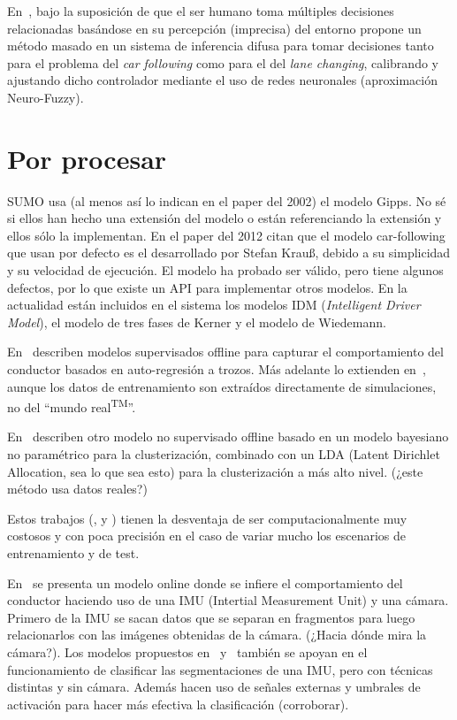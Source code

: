 En~\cite{Ma2004}, bajo la suposición de que el ser humano toma múltiples decisiones relacionadas basándose en su percepción (imprecisa) del entorno propone un método masado en un sistema de inferencia difusa para tomar decisiones tanto para el problema del \textit{car following} como para el del \textit{lane changing}, calibrando y ajustando dicho controlador mediante el uso de redes neuronales (aproximación Neuro-Fuzzy).

\section{Por procesar}

SUMO usa (al menos así lo indican en el paper del 2002) el modelo Gipps\cite{krajzewicz2002sumo}. No sé si ellos han hecho una extensión del modelo o están referenciando la extensión y ellos sólo la implementan. En el paper del 2012 citan que el modelo car-following que usan por defecto es el desarrollado por Stefan Krauß\cite{jin2016evaluation}, debido a su simplicidad y su velocidad de ejecución. El modelo ha probado ser válido, pero tiene algunos defectos, por lo que existe un API para implementar otros modelos. En la actualidad están incluidos en el sistema los modelos IDM\cite{treiber2000congested} (\textit{Intelligent Driver Model}), el modelo de tres fases de Kerner\cite{kerner2008testbed} y el modelo de Wiedemann\cite{wiedemann1974simulation}.

En~\cite{sekizawa2007modeling} describen modelos supervisados offline para capturar el comportamiento del conductor basados en auto-regresión a trozos. Más adelante lo extienden en~\cite{terada2010multi}, aunque los datos de entrenamiento son extraídos directamente de simulaciones, no del \enquote{mundo real\textsuperscript{TM}}.

En~\cite{bando2013unsupervised} describen otro modelo no supervisado offline basado en un modelo bayesiano no paramétrico para la clusterización, combinado con un LDA (Latent Dirichlet Allocation, sea lo que sea esto) para la clusterización a más alto nivel. (\TODO ¿este método usa datos reales?)

Estos trabajos (\cite{sekizawa2007modeling}, \cite{terada2010multi} y \cite{bando2013unsupervised}) tienen la desventaja de ser computacionalmente muy costosos y con poca precisión en el caso de variar mucho los escenarios de entrenamiento y de test.

En~\cite{maye2011bayesian} se presenta un modelo online donde se infiere el comportamiento del conductor haciendo uso de una IMU (Intertial Measurement Unit) y una cámara. Primero de la IMU se sacan datos que se separan en fragmentos para luego relacionarlos con las imágenes obtenidas de la cámara. (\TODO ¿Hacia dónde mira la cámara?). Los modelos propuestos en~\cite{johnson2011driving} y~\cite{van2013driver} también se apoyan en el funcionamiento de clasificar las segmentaciones de una IMU, pero con técnicas distintas y sin cámara. Además hacen uso de señales externas y umbrales de activación para hacer más efectiva la clasificación (\TODO corroborar).

